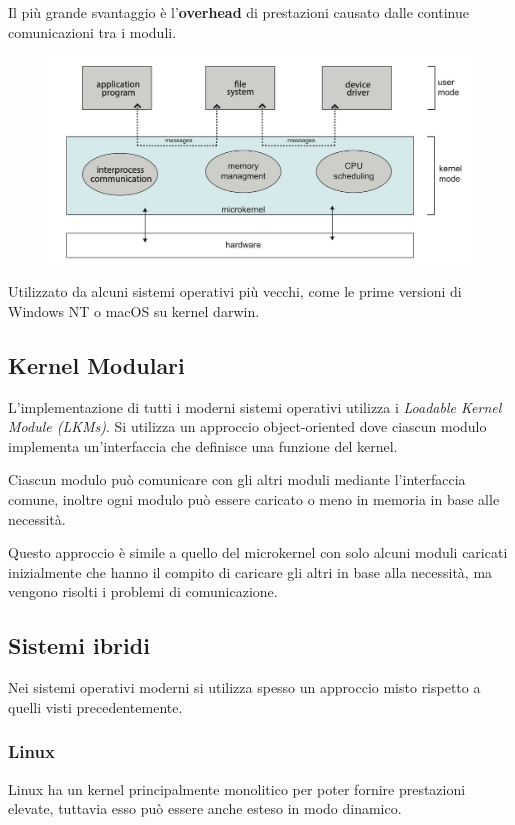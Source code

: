 Il più grande svantaggio è l'\textbf{overhead} di prestazioni causato dalle continue comunicazioni tra i moduli.

\begin{figure}[H]
    \centering
    \includegraphics[width=0.5\linewidth]{assets/microkernel.jpg}
\end{figure}

\begin{note}
    Utilizzato da alcuni sistemi operativi più vecchi, come le prime versioni di Windows NT o macOS su kernel darwin.
\end{note}

\subsection{Kernel Modulari}
L'implementazione di tutti i moderni sistemi operativi utilizza i \textit{Loadable Kernel Module (LKMs)}.
Si utilizza un approccio object-oriented dove ciascun modulo implementa un'interfaccia che definisce una funzione del kernel.

Ciascun modulo può comunicare con gli altri moduli mediante l'interfaccia comune, inoltre ogni modulo può essere caricato o meno in memoria in base alle necessità.

\spacer
Questo approccio è simile a quello del microkernel con solo alcuni moduli caricati inizialmente che hanno il compito di caricare gli altri in base alla necessità, ma vengono risolti i problemi di comunicazione.

\subsection{Sistemi ibridi}
Nei sistemi operativi moderni si utilizza spesso un approccio misto rispetto a quelli visti precedentemente.

\subsubsection*{Linux}
Linux ha un kernel principalmente monolitico per poter fornire prestazioni elevate, tuttavia esso può essere anche esteso in modo dinamico.

